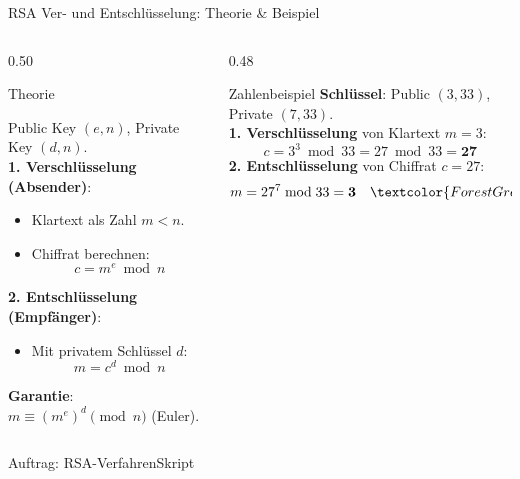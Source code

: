 \begin{frame}{RSA Ver- und Entschlüsselung: Theorie \& Beispiel}
	\begin{columns}[T]
		\begin{column}{0.50\textwidth}
			\begin{block}{Theorie}
				{\scriptsize
					Public Key $(e, n)$, Private Key $(d, n)$.\\[0.3em]
					\textbf{1. Verschlüsselung (Absender)}:
					\begin{itemize}
						\item Klartext als Zahl $m < n$.
						\item Chiffrat berechnen:
						      \[ c = m^e \bmod n \]
					\end{itemize}
					\textbf{2. Entschlüsselung (Empfänger)}:
					\begin{itemize}
						\item Mit privatem Schlüssel $d$:
						      \[ m = c^d \bmod n \]
					\end{itemize}
					\textbf{Garantie}: $m \equiv (m^e)^d \pmod n$ (Euler).
				}
			\end{block}
		\end{column}
		\begin{column}{0.48\textwidth}
			\begin{exampleblock}{Zahlenbeispiel}
				{\scriptsize
					\textbf{Schlüssel}: Public $(3, 33)$, Private $(7, 33)$.\\[0.3em]
					\textbf{1. Verschlüsselung} von Klartext $m = 3$:
					\[ c = 3^3 \bmod 33 = 27 \bmod 33 = \mathbf{27} \]
					\textbf{2. Entschlüsselung} von Chiffrat $c = 27$:
					\[ m = 27^7 \bmod 33 = \mathbf{3} \quad \textcolor{ForestGreen}{\mathbf{\checkmark}} \]
				}
			\end{exampleblock}
		\end{column}
	\end{columns}
\end{frame}

\begin{frame}{Auftrag: RSA-Verfahren}{Skript}
\end{frame}
